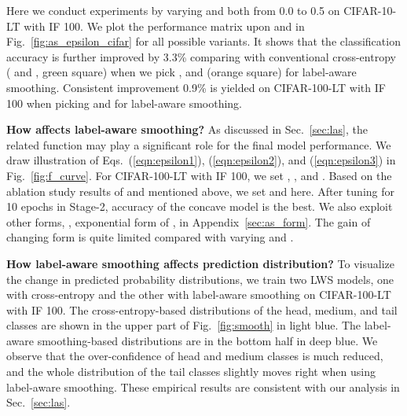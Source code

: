 \documentclass[final]{cvpr}
\begin{document}
	Here we conduct experiments by varying  and  both from 0.0 to 0.5 on CIFAR-10-LT with IF 100. We plot the performance matrix upon  and  in Fig.~\ref{fig:as_epsilon_cifar} for all possible variants. It shows that the classification accuracy is further improved by 3.3\% comparing with conventional cross-entropy ( and , green square) when we pick , and  (orange square) for label-aware smoothing. Consistent improvement 0.9\% is yielded on CIFAR-100-LT with IF 100 when picking  and  for label-aware smoothing. 
	
	\vspace{6pt}
	
	\noindent\textbf{How  affects label-aware smoothing?} \quad As discussed in Sec.~\ref{sec:las}, the related function  may play a significant role for the final model performance. We draw illustration of Eqs.~(\ref{eqn:epsilon1}), (\ref{eqn:epsilon2}), and (\ref{eqn:epsilon3}) in Fig.~\ref{fig:f_curve}. For CIFAR-100-LT with IF 100, we set , , and . Based on the ablation study results of  and  mentioned above, we set  and  here. After tuning for 10 epochs in Stage-2, accuracy of the concave model is the best. We also exploit other forms, \eg, exponential form of , in Appendix~\ref{sec:as_form}. The gain of changing form is quite limited compared with varying  and . 
	

	\vspace{6pt}
	
	\noindent\textbf{How label-aware smoothing affects prediction distribution?} \quad To visualize the change in predicted probability distributions, we train two LWS models, one with cross-entropy and the other with label-aware smoothing on CIFAR-100-LT with IF 100. The cross-entropy-based distributions of the head, medium, and tail classes are shown in the upper part of Fig.~\ref{fig:smooth} in light blue. The label-aware smoothing-based distributions are in the bottom half in deep blue. We observe that the over-confidence of head and medium classes is much reduced, and the whole distribution of the tail classes slightly moves right when using label-aware smoothing. These empirical results are consistent with our analysis in Sec.~\ref{sec:las}.
	
	
	
\end{document}
